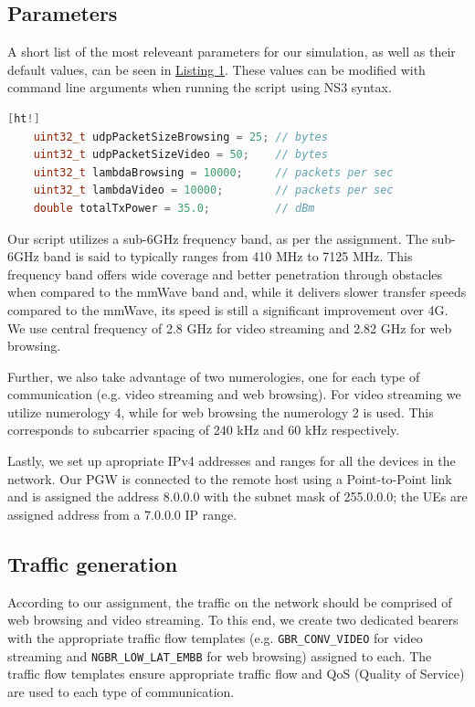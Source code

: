 \documentclass[10pt,a4]{article}
\begin{document}
    \subsection*{Parameters}
    A short list of the most releveant parameters for our simulation, as well as their default values, can be seen in \hyperref[lst:params]{Listing 1}. These values can be modified with command line arguments when running the script using NS3 syntax.
    \begin{lstlisting}[language=C++,caption=Relevant default parameters.,label=lst:params][ht!]
    uint32_t udpPacketSizeBrowsing = 25; // bytes
    uint32_t udpPacketSizeVideo = 50;    // bytes
    uint32_t lambdaBrowsing = 10000;     // packets per sec
    uint32_t lambdaVideo = 10000;        // packets per sec
    double totalTxPower = 35.0;          // dBm
    \end{lstlisting}
    Our script utilizes a sub-6GHz frequency band, as per the assignment. The sub-6GHz band is said to typically ranges from 410 MHz to 7125 MHz. This frequency band offers wide coverage and better penetration through obstacles when compared to the mmWave band and, while it delivers slower transfer speeds compared to the mmWave, its speed is still a significant improvement over 4G. We use central frequency of 2.8 GHz for video streaming and 2.82 GHz for web browsing.

    Further, we also take advantage of two numerologies, one for each type of communication (e.g. video streaming and web browsing). For video streaming we utilize numerology 4, while for web browsing the numerology 2 is used. This corresponds to subcarrier spacing of 240 kHz and 60 kHz respectively.

    Lastly, we set up apropriate IPv4 addresses and ranges for all the devices in the network. Our PGW is connected to the remote host using a Point-to-Point link and is assigned the address 8.0.0.0 with the subnet mask of 255.0.0.0; the UEs are assigned address from a 7.0.0.0 IP range.
    \subsection*{Traffic generation}
    According to our assignment, the traffic on the network should be comprised of web browsing and video streaming. To this end, we create two dedicated bearers with the appropriate traffic flow templates (e.g. \texttt{GBR\_CONV\_VIDEO} for video streaming and \texttt{NGBR\_LOW\_LAT\_EMBB} for web browsing) assigned to each. The traffic flow templates ensure appropriate traffic flow and QoS (Quality of Service) are used to each type of communication.
\end{document}
